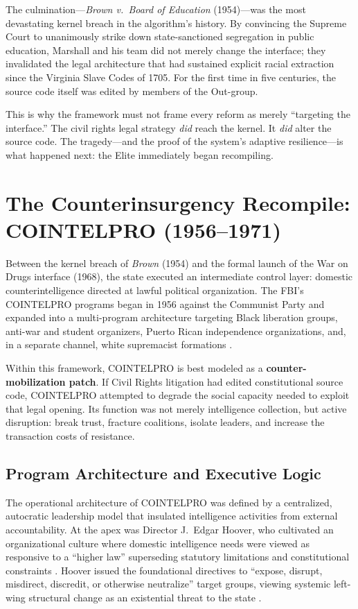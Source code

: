 \documentclass[12pt,openany]{book}
\begin{document}
The culmination---\textit{Brown v.\ Board of Education} (1954)---was the most devastating kernel breach in the algorithm's history. By convincing the Supreme Court to unanimously strike down state-sanctioned segregation in public education, Marshall and his team did not merely change the interface; they invalidated the legal architecture that had sustained explicit racial extraction since the Virginia Slave Codes of 1705. For the first time in five centuries, the source code itself was edited by members of the Out-group.

This is why the framework must not frame every reform as merely ``targeting the interface.'' The civil rights legal strategy \textit{did} reach the kernel. It \textit{did} alter the source code. The tragedy---and the proof of the system's adaptive resilience---is what happened next: the Elite immediately began recompiling.

\section{The Counterinsurgency Recompile: COINTELPRO (1956--1971)}
\label{sec:cointelpro_recompile}

Between the kernel breach of \textit{Brown} (1954) and the formal launch of the War on Drugs interface (1968), the state executed an intermediate control layer: domestic counterintelligence directed at lawful political organization. The FBI's COINTELPRO programs began in 1956 against the Communist Party and expanded into a multi-program architecture targeting Black liberation groups, anti-war and student organizers, Puerto Rican independence organizations, and, in a separate channel, white supremacist formations \cite{fbi_cointelpro_vault, fbi_new_left_vault, fbi_white_hate_vault}.

Within this framework, COINTELPRO is best modeled as a \textbf{counter-mobilization patch}. If Civil Rights litigation had edited constitutional source code, COINTELPRO attempted to degrade the social capacity needed to exploit that legal opening. Its function was not merely intelligence collection, but active disruption: break trust, fracture coalitions, isolate leaders, and increase the transaction costs of resistance.

\subsection{Program Architecture and Executive Logic}

The operational architecture of COINTELPRO was defined by a centralized, autocratic leadership model that insulated intelligence activities from external accountability. At the apex was Director J.\ Edgar Hoover, who cultivated an organizational culture where domestic intelligence needs were viewed as responsive to a ``higher law'' superseding statutory limitations and constitutional constraints \cite{fbi_cointelpro_vault}. Hoover issued the foundational directives to ``expose, disrupt, misdirect, discredit, or otherwise neutralize'' target groups, viewing systemic left-wing structural change as an existential threat to the state \cite{church_book2_1976}.
\end{document}
